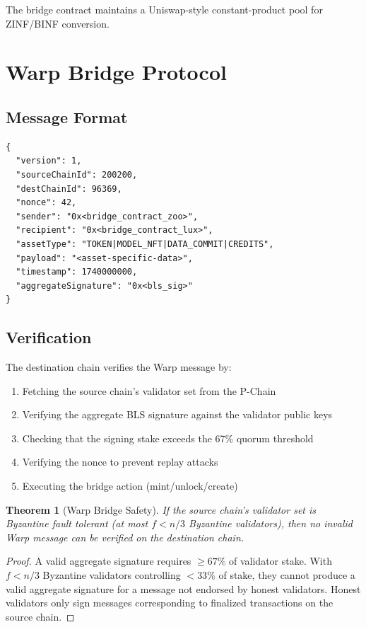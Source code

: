 \documentclass[11pt,letterpaper]{article}
\newtheorem{theorem}{Theorem}[section]
\begin{document}
The bridge contract maintains a Uniswap-style constant-product pool for ZINF/BINF conversion.

\section{Warp Bridge Protocol}
\label{sec:warp}

\subsection{Message Format}

\begin{lstlisting}[basicstyle=\ttfamily\small,caption=Zoo Bridge Warp Message]
{
  "version": 1,
  "sourceChainId": 200200,
  "destChainId": 96369,
  "nonce": 42,
  "sender": "0x<bridge_contract_zoo>",
  "recipient": "0x<bridge_contract_lux>",
  "assetType": "TOKEN|MODEL_NFT|DATA_COMMIT|CREDITS",
  "payload": "<asset-specific-data>",
  "timestamp": 1740000000,
  "aggregateSignature": "0x<bls_sig>"
}
\end{lstlisting}

\subsection{Verification}

The destination chain verifies the Warp message by:

\begin{enumerate}
    \item Fetching the source chain's validator set from the P-Chain
    \item Verifying the aggregate BLS signature against the validator public keys
    \item Checking that the signing stake exceeds the 67\% quorum threshold
    \item Verifying the nonce to prevent replay attacks
    \item Executing the bridge action (mint/unlock/create)
\end{enumerate}

\begin{theorem}[Warp Bridge Safety]
If the source chain's validator set is Byzantine fault tolerant (at most $f < n/3$ Byzantine validators), then no invalid Warp message can be verified on the destination chain.
\end{theorem}

\begin{proof}
A valid aggregate signature requires $\geq 67\%$ of validator stake. With $f < n/3$ Byzantine validators controlling $< 33\%$ of stake, they cannot produce a valid aggregate signature for a message not endorsed by honest validators. Honest validators only sign messages corresponding to finalized transactions on the source chain.
\end{proof}
\end{document}
